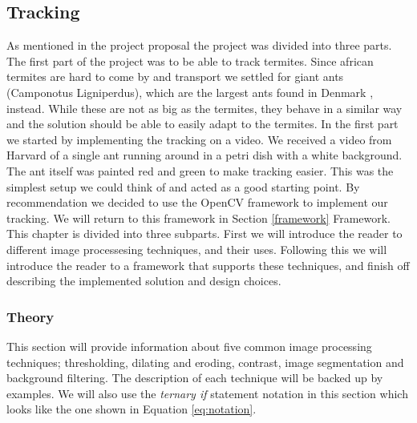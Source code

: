 
\subsection{Tracking}
\label{tracking}
As mentioned in the project proposal the project was divided into three parts. The first part of the project was to be able to track termites. Since african termites are hard to come by and transport we settled for giant ants (Camponotus Ligniperdus), which are the largest ants found in Denmark \cite{fogn}, instead. While these are not as big as the termites, they behave in a similar way and the solution should be able to easily adapt to the termites. In the first part we started by implementing the tracking on a video. We received a video from Harvard of a single ant running around in a petri dish with a white background. The ant itself was painted red and green to make tracking easier. This was the simplest setup we could think of and acted as a good starting point. By recommendation we decided to use the OpenCV \cite{opencv} framework to implement our tracking. We will return to this framework in Section \ref{framework} Framework. \\

This chapter is divided into three subparts. First we will introduce the reader to different image processesing techniques, and their uses. Following this we will introduce the reader to a framework that supports these techniques, and finish off describing the implemented solution and design choices.

% 
% 

\subsubsection{Theory} \mbox{}\par
{}
This section will provide information about five common image processing techniques; thresholding, dilating and eroding, contrast, image segmentation and background filtering. The description of each technique will be backed up by examples. We will also use the \textit{ternary if} statement notation in this section which looks like the one shown in Equation \ref{eq:notation}.

